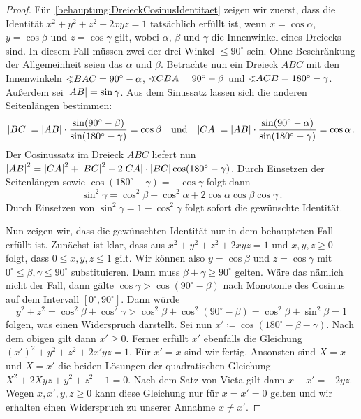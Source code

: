 \begin{proof}
	Für~\ref{behauptung:DreieckCosinusIdentitaet} zeigen wir zuerst, dass die Identität $x^2+y^2+z^2+2xyz=1$ tatsächlich erfüllt ist, wenn $x=\cos\alpha$, $y=\cos\beta$ und $z=\cos\gamma$ gilt, wobei $\alpha$, $\beta$ und $\gamma$ die Innenwinkel eines Dreiecks sind. In diesem Fall müssen zwei der drei Winkel $\leqslant 90^\circ$ sein. Ohne Beschränkung der Allgemeinheit seien das $\alpha$ und $\beta$. Betrachte nun ein Dreieck $ABC$ mit den  Innenwinkeln $\winkel BAC=90^\circ-\alpha$, $\winkel CBA=90^\circ-\beta$ und $\winkel ACB=180^\circ-\gamma$. Außerdem sei $\abs*{AB}=\sin\gamma$. Aus dem Sinussatz lassen sich die anderen Seitenlängen bestimmen:
	\begin{equation*}
		\abs*{BC}=\abs{AB}\cdot \frac{\sin(90^\circ-\beta)}{\sin(180^\circ-\gamma)}=\cos \beta\quad\text{und}\quad \abs*{CA}=\abs{AB}\cdot \frac{\sin(90^\circ-\alpha)}{\sin(180^\circ-\gamma)}=\cos \alpha\,.
	\end{equation*}
	Der Cosinussatz im Dreieck $ABC$ liefert nun $\abs*{AB}^2=\abs*{CA}^2+\abs*{BC}^2-2\abs*{CA}\cdot\abs*{BC}\cos(180^\circ-\gamma)$. Durch Einsetzen der Seitenlängen sowie $\cos(180^\circ-\gamma)=-\cos\gamma$ folgt dann
	\begin{equation*}
		\sin^2\gamma=\cos^2\beta+\cos^2\alpha+2\cos\alpha\cos\beta \cos\gamma\,.
	\end{equation*}
	Durch Einsetzen von $\sin^2\gamma=1-\cos^2\gamma$ folgt sofort die gewünschte Identität.
	
	Nun zeigen wir, dass die gewünschten Identität nur in dem behaupteten Fall erfüllt ist. Zunächst ist klar, dass aus $x^2+y^2+z^2+2xyz=1$ und $x,y,z\geqslant 0$ folgt, dass $0\leqslant x,y,z\leqslant 1$ gilt. Wir können also $y=\cos\beta$ und $z=\cos\gamma$ mit $0^\circ\leqslant \beta,\gamma\leqslant 90^\circ$ substituieren. Dann muss $\beta+\gamma\geqslant 90^\circ$ gelten. Wäre das nämlich nicht der Fall, dann gälte $\cos\gamma>\cos(90^\circ-\beta)$ nach Monotonie des Cosinus auf dem Intervall $[0^\circ,90^\circ]$. Dann würde
	\begin{equation*}
		y^2+z^2=\cos^2\beta+\cos^2\gamma>\cos^2\beta+\cos^2(90^\circ-\beta)=\cos^2\beta+\sin^2\beta=1
	\end{equation*}
	folgen, was einen Widerspruch darstellt. Sei nun $x'\coloneqq \cos(180^\circ-\beta-\gamma)$. Nach dem obigen gilt dann $x'\geqslant 0$. Ferner erfüllt $x'$ ebenfalls die Gleichung $(x')^2+y^2+z^2+2x'yz=1$. Für $x'=x$ sind wir fertig. Ansonsten sind $X=x$ und $X=x'$ die beiden Lösungen der quadratischen Gleichung $X^2+2Xyz+y^2+z^2-1=0$. Nach dem Satz von Vieta gilt dann $x+x'=-2yz$. Wegen $x,x',y,z\geqslant 0$ kann diese Gleichung nur für $x=x'=0$ gelten und wir erhalten einen Widerspruch zu unserer Annahme $x\neq x'$.
\end{proof}

